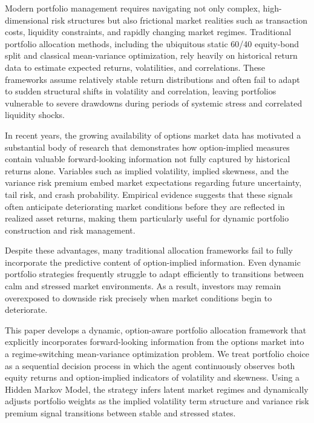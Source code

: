 \documentclass[12pt]{article}
\begin{document}

Modern portfolio management requires navigating not only complex, high-dimensional risk structures but also frictional market realities such as transaction costs, liquidity constraints, and rapidly changing market regimes. Traditional portfolio allocation methods, including the ubiquitous static 60/40 equity-bond split and classical mean-variance optimization, rely heavily on historical return data to estimate expected returns, volatilities, and correlations. These frameworks assume relatively stable return distributions and often fail to adapt to sudden structural shifts in volatility and correlation, leaving portfolios vulnerable to severe drawdowns during periods of systemic stress and correlated liquidity shocks.

In recent years, the growing availability of options market data has motivated a substantial body of research that demonstrates how option-implied measures contain valuable forward-looking information not fully captured by historical returns alone. Variables such as implied volatility, implied skewness, and the variance risk premium embed market expectations regarding future uncertainty, tail risk, and crash probability. Empirical evidence suggests that these signals often anticipate deteriorating market conditions before they are reflected in realized asset returns, making them particularly useful for dynamic portfolio construction and risk management.

Despite these advantages, many traditional allocation frameworks fail to fully incorporate the predictive content of option-implied information. Even dynamic portfolio strategies frequently struggle to adapt efficiently to transitions between calm and stressed market environments. As a result, investors may remain overexposed to downside risk precisely when market conditions begin to deteriorate.

This paper develops a dynamic, option-aware portfolio allocation framework that explicitly incorporates forward-looking information from the options market into a regime-switching mean-variance optimization problem. We treat portfolio choice as a sequential decision process in which the agent continuously observes both equity returns and option-implied indicators of volatility and skewness. Using a Hidden Markov Model, the strategy infers latent market regimes and dynamically adjusts portfolio weights as the implied volatility term structure and variance risk premium signal transitions between stable and stressed states.
\end{document}
